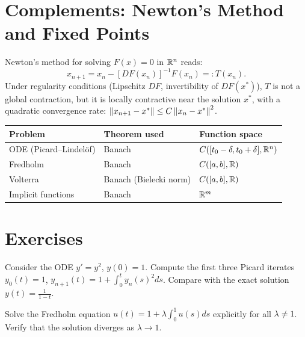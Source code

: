 \section{Complements: Newton's Method and Fixed Points}

\begin{proposition}
Newton's method for solving $F(x) = 0$ in $\mathbb{R}^n$ reads:
\[
  x_{n+1} = x_n - [DF(x_n)]^{-1} F(x_n) =: T(x_n).
\]
Under regularity conditions (Lipschitz $DF$, invertibility of $DF(x^*)$), $T$ is not a
global contraction, but it is locally contractive near the solution $x^*$, with a
quadratic convergence rate: $\left\| x_{n+1} - x^* \right\| \leq C \left\| x_n - x^* \right\|^2$.
\end{proposition}

\begin{keyformulas}[title=\textbf{Summary of applications}]
\begin{center}
\renewcommand{\arraystretch}{1.3}
\begin{tabular}{|l|l|l|}
\hline
\textbf{Problem} & \textbf{Theorem used} & \textbf{Function space} \\
\hline
ODE (Picard--Lindel\"of) & Banach & $C([t_0-\delta, t_0+\delta], \mathbb{R}^n)$ \\
Fredholm & Banach & $C([a,b], \mathbb{R})$ \\
Volterra & Banach (Bielecki norm) & $C([a,b], \mathbb{R})$ \\
Implicit functions & Banach & $\mathbb{R}^m$ \\
\hline
\end{tabular}
\end{center}
\end{keyformulas}

\section{Exercises}

\begin{exercise}
Consider the ODE $y' = y^2$, $y(0) = 1$. Compute the first three Picard iterates
$y_0(t) = 1$, $y_{n+1}(t) = 1 + \int_0^t y_n(s)^2 ds$. Compare with the exact solution
$y(t) = \frac{1}{1-t}$.
\end{exercise}

\begin{exercise}
Solve the Fredholm equation $u(t) = 1 + \lambda \int_0^1 u(s) ds$ explicitly for all
$\lambda \neq 1$. Verify that the solution diverges as $\lambda \to 1$.
\end{exercise}

